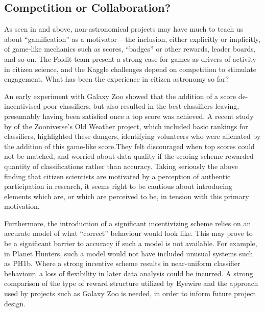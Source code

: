 \documentclass{ar2e}
\begin{document}

\subsection{Competition or Collaboration?}
\label{sec:crowd:gamification}

As seen in  and   above,
non-astronomical projects may have much to teach us about ``gamification'' as a
motivator -- the inclusion, either explicitly or implicitly, of game-like
mechanics such as scores, ``badges'' or other rewards, leader boards, and so on.
The Foldit team present a strong case for games as drivers of activity in
citizen science, and the Kaggle challenges depend on competition to stimulate
engagement. What has been the experience in citizen astronomy so far?

An early experiment with Galaxy Zoo showed that the addition of a score
de-incentivised poor classifiers, but also resulted in the best classifiers
leaving, presumably having been satisfied once a top score was achieved. A
recent study by \citep{Eveleigh++2013} of the Zooniverse's Old Weather
project, which included basic rankings for classifiers, highlighted these
dangers, identifying volunteers who were alienated by the addition of this
game-like score.They felt discouraged when top scores could not be matched, and
worried about data quality if the scoring scheme rewarded quantity of
classifications rather than accuracy. Taking seriously the above finding  that
citizen scientists are motivated by a perception of authentic participation in
research, it seems right to be cautious about introducing elements which are, or
which are perceived to be, in tension with this primary motivation. 

Furthermore, the introduction of a significant incentivizing scheme relies on an
accurate model of what ``correct'' behaviour would look like. This may prove to
be a significant barrier to accuracy if such a model is not available. For
example, in Planet Hunters, such a model would not have included unusual systems
such as PH1b. Where a strong incentive scheme results in near-uniform classifier
behaviour, a loss of flexibility in later data analysis could be incurred.  A
strong comparison of the type of reward structure utilized by Eyewire and the
approach used by projects such as Galaxy Zoo is needed, in order to inform
future project design. 
\end{document}
